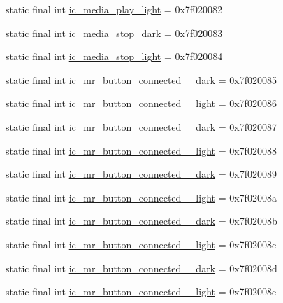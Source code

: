 \begin{CompactItemize}
static final int \hyperlink{classandroid_1_1support_1_1v4_1_1_r_1_1drawable_4231b9099ac8f747b64ea591c2b6b66e}{ic\_\-media\_\-play\_\-light} = 0x7f020082
\item 
static final int \hyperlink{classandroid_1_1support_1_1v4_1_1_r_1_1drawable_fcf9b9a20997fa2853aa3c95f4c56cfa}{ic\_\-media\_\-stop\_\-dark} = 0x7f020083
\item 
static final int \hyperlink{classandroid_1_1support_1_1v4_1_1_r_1_1drawable_233fa61d2bdd4cdb0271347e67681743}{ic\_\-media\_\-stop\_\-light} = 0x7f020084
\item 
static final int \hyperlink{classandroid_1_1support_1_1v4_1_1_r_1_1drawable_4fcb5567ac04e2b2cfea92736e21bf47}{ic\_\-mr\_\-button\_\-connected\_\_\-dark} = 0x7f020085
\item 
static final int \hyperlink{classandroid_1_1support_1_1v4_1_1_r_1_1drawable_7948bae92c9478e399c5f76925c23e99}{ic\_\-mr\_\-button\_\-connected\_\_\-light} = 0x7f020086
\item 
static final int \hyperlink{classandroid_1_1support_1_1v4_1_1_r_1_1drawable_0d526a4b081c23b9c7de1af3c70bb6e6}{ic\_\-mr\_\-button\_\-connected\_\_\-dark} = 0x7f020087
\item 
static final int \hyperlink{classandroid_1_1support_1_1v4_1_1_r_1_1drawable_09e54f06c06e92e4e8519c5b5450b613}{ic\_\-mr\_\-button\_\-connected\_\_\-light} = 0x7f020088
\item 
static final int \hyperlink{classandroid_1_1support_1_1v4_1_1_r_1_1drawable_577d9f3a781ff36c3b9f65abe69e3606}{ic\_\-mr\_\-button\_\-connected\_\_\-dark} = 0x7f020089
\item 
static final int \hyperlink{classandroid_1_1support_1_1v4_1_1_r_1_1drawable_067467b1b9c5615ca327fe735d3d7331}{ic\_\-mr\_\-button\_\-connected\_\_\-light} = 0x7f02008a
\item 
static final int \hyperlink{classandroid_1_1support_1_1v4_1_1_r_1_1drawable_7afd2cfdb9d3a9cbb789862febec7ca8}{ic\_\-mr\_\-button\_\-connected\_\_\-dark} = 0x7f02008b
\item 
static final int \hyperlink{classandroid_1_1support_1_1v4_1_1_r_1_1drawable_99a2b9599640741d0b1abdf9ffcad8ee}{ic\_\-mr\_\-button\_\-connected\_\_\-light} = 0x7f02008c
\item 
static final int \hyperlink{classandroid_1_1support_1_1v4_1_1_r_1_1drawable_a132a19b009a3cfa20d1c1b339da0f8d}{ic\_\-mr\_\-button\_\-connected\_\_\-dark} = 0x7f02008d
\item 
static final int \hyperlink{classandroid_1_1support_1_1v4_1_1_r_1_1drawable_209552274033e673b6df107fd62d1102}{ic\_\-mr\_\-button\_\-connected\_\_\-light} = 0x7f02008e

\end{CompactItemize}
